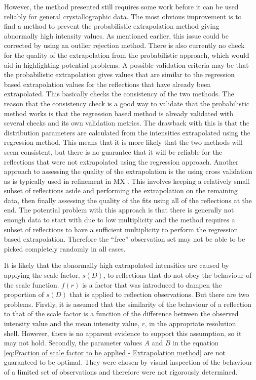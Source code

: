 However, the method presented still requires some work before it can be used reliably for general crystallographic data.
The most obvious improvement is to find a method to prevent the probabilistic extrapolation method giving abnormally high intensity values.
As mentioned earlier, this issue could be corrected by using an outlier rejection method.
There is also currently no check for the quality of the extrapolation from the probabilistic approach, which would aid in highlighting potential problems.
A possible validation criteria may be that the probabilistic extrapolation gives values that are similar to the regression based extrapolation values for the reflections that have already been extrapolated.
This basically checks the consistency of the two methods.
The reason that the consistency check is a good way to validate that the probabilistic method works is that the regression based method is already validated with several checks and its own validation metrics.
The drawback with this is that the distribution parameters are calculated from the intensities extrapolated using the regression method.
This means that it is more likely that the two methods will seem consistent, but there is no guarantee that it will be reliable for the reflections that were not extrapolated using the regression approach.
Another approach to assessing the quality of the extrapolation is the using cross validation as is typically used in refinement in MX \cite{brunger199719}.
This involves keeping a relatively small subset of reflections aside and performing the extrapolation on the remaining data, then finally assessing the quality of the fits using all of the reflections at the end.
The potential problem with this approach is that there is generally not enough data to start with due to low multiplicity and the method requires a subset of reflections to have a sufficient multiplicity to perform the regression based extrapolation.
Therefore the ``free'' observation set may not be able to be picked completely randomly in all cases.

It is likely that the abnormally high extrapolated intensities are caused by applying the scale factor, $s(D)$, to reflections that do not obey the behaviour of the scale function.
$f(r)$ is a factor that was introduced to dampen the proportion of $s(D)$ that is applied to reflection observations.
But there are two problems.
Firstly, it is assumed that the similarity of the behaviour of a reflection to that of the scale factor is a function of the difference between the observed intensity value and the mean intensity value, $r$, in the appropriate resolution shell.
However, there is no apparent evidence to support this assumption, so it may not hold.
Secondly, the parameter values $A$ and $B$ in the equation \ref{eq:Fraction of scale factor to be applied - Extrapolation method} are not guaranteed to be optimal.
They were chosen by visual inspection of the behaviour of a limited set of observations and therefore were not rigorously determined.

